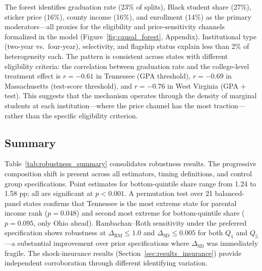The forest identifies graduation rate (23\% of splits), Black student
share (27\%), sticker price (16\%), county income (16\%), and
enrollment (14\%) as the primary moderators---all proxies for the
eligibility and price-sensitivity channels formalized in the model
(Figure~\ref{fig:causal_forest}, Appendix). Institutional type
(two-year vs.\ four-year), selectivity, and flagship status explain
less than 2\% of heterogeneity each. The pattern is consistent
across states with different eligibility criteria: the correlation
between graduation rate and the college-level treatment effect is
$r = -0.61$ in Tennessee (GPA threshold), $r = -0.69$ in
Massachusetts (test-score threshold), and $r = -0.76$ in West
Virginia (GPA $+$ test). This suggests that the mechanism operates
through the density of marginal students at each institution---where
the price channel has the most traction---rather than the specific
eligibility criterion.

\subsection{Summary}

Table~\ref{tab:robustness_summary} consolidates robustness results. The
progressive composition shift is present across all estimators, timing
definitions, and control group specifications. Point estimates for
bottom-quintile share range from 1.24 to 1.58 pp; all are significant at
$p < 0.001$. A permutation test over 21 balanced-panel states confirms that
Tennessee is the most extreme state for parental income rank
($p = 0.048$) and second most extreme for bottom-quintile share
($p = 0.095$, only Ohio ahead). Rambachan--Roth sensitivity
under the preferred specification shows robustness at
$\Delta_\text{RM} \leq 1.0$ and $\Delta_\text{SD} \leq 0.005$ for both
$Q_1$ and $Q_5$---a substantial improvement over prior specifications
where $\Delta_\text{SD}$ was immediately fragile. The shock-insurance
results (Section~\ref{sec:results_insurance}) provide independent
corroboration through different identifying variation.
